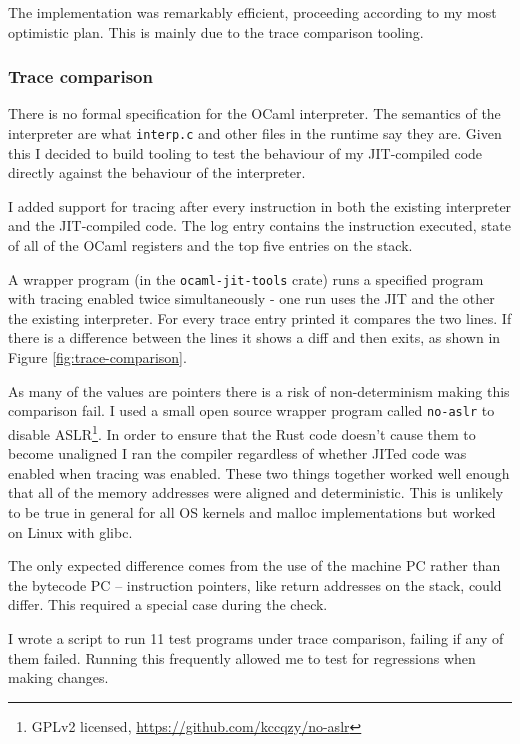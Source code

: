 The implementation was remarkably efficient, proceeding according to my most optimistic plan. This
is mainly due to the trace comparison tooling.

\subsubsection{Trace comparison} \label{trace-comparison}

There is no formal specification for the OCaml interpreter. The semantics of the interpreter are
what
\texttt{interp.c} and other files in the runtime say they are. Given this I decided to build
tooling to test the behaviour of my JIT-compiled code directly against the behaviour of the
interpreter.

I added support for tracing after every instruction in both the existing interpreter and the
JIT-compiled code. The log entry contains the instruction executed, state of all of the OCaml
registers and the top five entries on the stack.

A wrapper program (in the \texttt{ocaml-jit-tools} crate) runs a specified program with tracing
enabled twice simultaneously - one run uses the JIT and the other the existing interpreter.  For
every trace entry printed it compares the two lines. If there is a difference between the lines it
shows a diff and then exits, as shown in Figure \ref{fig:trace-comparison}.

As many of the values are pointers there is a risk of non-determinism making this comparison fail.
I used a small open source wrapper program called \texttt{no-aslr} to disable ASLR\footnote{GPLv2
      licensed, \url{https://github.com/kccqzy/no-aslr}}. In order to ensure
that the Rust code doesn't cause them to become unaligned I ran the compiler regardless of whether
JITed code was enabled when tracing was enabled. These two things together worked well enough that
all of the memory addresses were aligned and deterministic. This is unlikely to be true in general
for all OS kernels and malloc implementations but worked on Linux with glibc.

The only expected difference comes from the use of the machine PC rather than the bytecode PC --
instruction pointers, like return addresses on the stack, could differ. This required a special
case during the check.

I wrote a script to run 11 test programs under trace comparison, failing if any of them failed.
Running this frequently allowed me to test for regressions when making changes.

